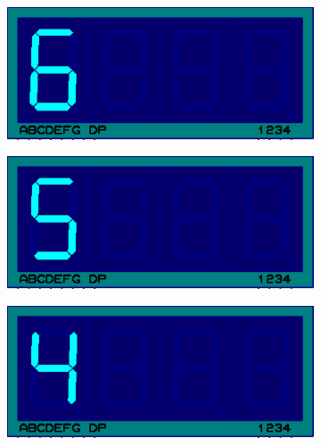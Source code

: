 \documentclass{lab_sheet}
\begin{document}
\begin{figure}[H]\ContinuedFloat
      \begin{subfigure}{.33\textwidth}
        \centering
        \includegraphics[frame,width=.9\linewidth]{../Figures/s6}   
        \caption{}
        \label{fig:prob1-m}
      \end{subfigure}
      \begin{subfigure}{.33\textwidth}
        \centering
        \includegraphics[frame,width=.9\linewidth]{../Figures/s5}   
        \caption{}
        \label{fig:prob1-n}
      \end{subfigure}
      \begin{subfigure}{.33\textwidth}
        \centering
        \includegraphics[frame,width=.9\linewidth]{../Figures/s4}   
        \caption{}
        \label{fig:prob1-o}
      \end{subfigure}
      \newline
      \begin{subfigure}{.33\textwidth}

\end{subfigure}
\end{figure}
\end{document}
